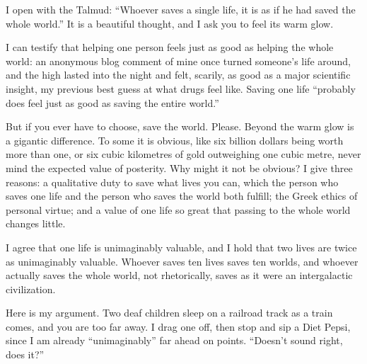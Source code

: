 
I open with the Talmud: ``Whoever saves a single life, it is as if he had saved the whole world.''  It is a beautiful thought, and I ask you to feel its warm glow.

I can testify that helping one person feels just as good as helping the whole world: an anonymous blog comment of mine once turned someone's life around, and the high lasted into the night and felt, scarily, as good as a major scientific insight, my previous best guess at what drugs feel like.  Saving one life ``probably does feel just as good as saving the entire world.''

But if you ever have to choose, save the world. Please. Beyond the warm glow is a gigantic difference. To some it is obvious, like six billion dollars being worth more than one, or six cubic kilometres of gold outweighing one cubic metre, never mind the expected value of posterity. Why might it not be obvious? I give three reasons: a qualitative duty to save what lives you can, which the person who saves one life and the person who saves the world both fulfill; the Greek ethics of personal virtue; and a value of one life so great that passing to the whole world changes little. 

I agree that one life is unimaginably valuable, and I hold that two lives are twice as unimaginably valuable. Whoever saves ten lives saves ten worlds, and whoever actually saves the whole world, not rhetorically, saves as it were an intergalactic civilization.

Here is my argument. Two deaf children sleep on a railroad track as a train comes, and you are too far away. I drag one off, then stop and sip a Diet Pepsi, since I am already ``unimaginably'' far ahead on points. ``Doesn't sound right, does it?'' 

